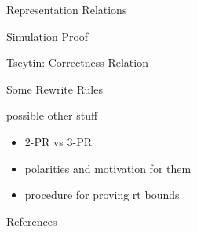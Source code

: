 \documentclass[11pt,usenames,dvipsnames,
hyperref={pdfencoding=auto,psdextra}]{beamer}
\begin{document}
\begin{frame}{Representation Relations}
\end{frame}

\begin{frame}{Simulation Proof}
\end{frame}

\begin{frame}{Tseytin: Correctness Relation}
\end{frame}

\begin{frame}{Some Rewrite Rules}
\end{frame}

\begin{frame}{possible other stuff}
  \begin{itemize}
    \item 2-PR vs 3-PR
    \item polarities and motivation for them
    \item procedure for proving rt bounds
  \end{itemize}
\end{frame}

\begin{frame}[allowframebreaks]{References}
  \nocite{Sipser:TheoryofComputation}
  \nocite{Bläser:TISkript}
  
  {}
\end{frame}
\end{document}
